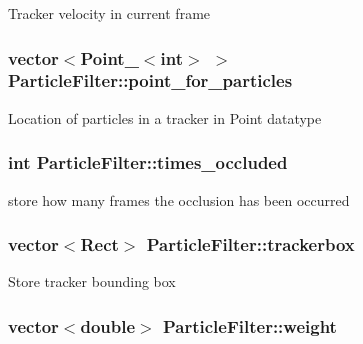 Tracker velocity in current frame \hypertarget{classParticleFilter_a92daeb1540baafc2b3bf6fec5b607120}{
\subsubsection[{point\-\_\-for\-\_\-particles}]{\setlength{\rightskip}{0pt plus 5cm}vector$<$Point\-\_\-$<$int$>$ $>$ Particle\-Filter\-::point\-\_\-for\-\_\-particles\hspace{0.3cm}{\ttfamily [protected]}}}\label{classParticleFilter_a92daeb1540baafc2b3bf6fec5b607120}
Location of particles in a tracker in Point datatype \hypertarget{classParticleFilter_adb05b2cbeb1b467ef5328b9d3c43f69c}{
\subsubsection[{times\-\_\-occluded}]{\setlength{\rightskip}{0pt plus 5cm}int Particle\-Filter\-::times\-\_\-occluded\hspace{0.3cm}{\ttfamily [protected]}}}\label{classParticleFilter_adb05b2cbeb1b467ef5328b9d3c43f69c}
store how many frames the occlusion has been occurred \hypertarget{classParticleFilter_ad7931abf64ab6494bae0d9884536e97d}{
\subsubsection[{trackerbox}]{\setlength{\rightskip}{0pt plus 5cm}vector$<$Rect$>$ Particle\-Filter\-::trackerbox\hspace{0.3cm}{\ttfamily [protected]}}}\label{classParticleFilter_ad7931abf64ab6494bae0d9884536e97d}
Store tracker bounding box \hypertarget{classParticleFilter_a1363d05f9deb026bd5e07a1406a994e5}{
\subsubsection[{weight}]{\setlength{\rightskip}{0pt plus 5cm}vector$<$double$>$ Particle\-Filter\-::weight\hspace{0.3cm}{\ttfamily [protected]}}}\label{classParticleFilter_a1363d05f9deb026bd5e07a1406a994e5}
